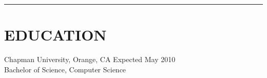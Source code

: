 \documentclass{res}
\begin{document}
 


\address{5205 E. Rolling Hill Drive\\Anaheim, CA 92807\\(714)209-2092}

\address{smith237@mail.chapman.edu\\yasumoto7@gmail.com\\joe@joemsmith.com}

\begin{resume}

\rule{\textwidth}{1pt}

\section{EDUCATION}          
	 Chapman University, Orange, CA \hspace{2.65in} Expected May 2010\\
	 Bachelor of Science, Computer Science \\


\end{resume}
\end{document}
